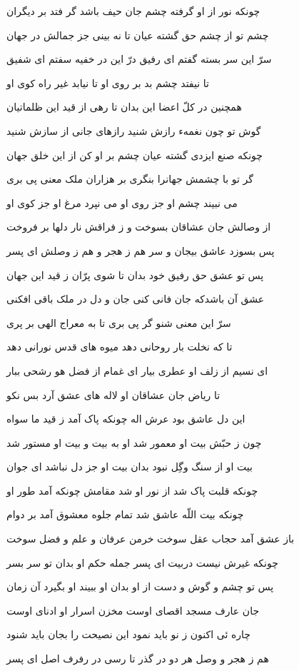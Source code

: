 چونکه نور از او گرفته چشم جان
حيف باشد گر فتد بر ديگران

چشم تو از چشم حق گشته عيان
تا نه بينى جز جمالش در جهان

سرّ اين سر بسته گفتم اى رفيق
درّ اين در خفيه سفتم اى شفيق

تا نيفتد چشم بد بر روى او
تا نيابد غير راه کوى او

همچنين در کلّ اعضا اين بدان
تا رهى از قيد اين ظلماتيان

گوش تو چون نغمهء رازش شنيد
رازهاى جانى از سازش شنيد

چونکه صنع ايزدى گشته عيان
چشم بر او کن از اين خلق جهان

گر تو با چشمش جهانرا بنگرى
بر هزاران ملک معنى پى برى

مى نبيند چشم او جز روى او
مى نپرد مرغ او جز کوى او

از وصالش جان عشاقان بسوخت
و ز فراقش نار دلها بر فروخت

پس بسوزد عاشق بيجان و سر
هم ز هجر و هم ز وصلش اى پسر

پس تو عشق حق رفيق خود بدان
تا شوى پرّان ز قيد اين جهان

عشق آن باشدکه جان فانى کنى
جان و دل در ملک باقى افکنى

سرّ اين معنى شنو گر پى برى
تا به معراج الهى بر پرى

تا که نخلت بار روحانى دهد
ميوه هاى قدس نورانى دهد

اى نسيم از زلف او عطرى بيار
اى غمام از فضل هو رشحى ببار

تا رياض جان عشاقان او
لاله هاى عشق آرد بس نکو

اين دل عاشق بود عرش اله
چونکه پاک آمد ز قيد ما سواه

چون ز حبّش بيت او معمور شد
او به بيت و بيت او مستور شد

بيت او از سنگ وگِل نبود بدان
بيت او جز دل نباشد اى جوان

چونکه قلبت پاک شد از نور او
شد مقامش چونکه آمد طور او

چونکه بيت اللّه عاشق شد‌ تمام
جلوه معشوق آمد بر دوام

باز عشق آمد حجاب عقل سوخت
خرمن عرفان و علم و فضل سوخت

چونکه غيرش نيست دربيت اى پسر
جمله حکم او بدان تو سر بسر

پس تو چشم و گوش و دست از‌ او بدان
او ببيند او بگيرد آن زمان

جان عارف مسجد اقصاى اوست
مخزن اسرار او ادناى اوست

چاره ئى اکنون ز نو بايد نمود
اين نصيحت را بجان بايد شنود

هم ز هجر و وصل هر دو در گذر
تا رسى در رفرف اصل اى پسر

